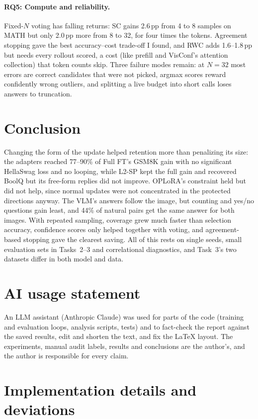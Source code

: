 \documentclass{article}
\newcommand{\pp}{\,pp}
\begin{document}
\paragraph{RQ5: Compute and reliability.} Fixed-$N$ voting has falling returns: SC gains 2.6\pp{} from 4 to 8 samples on MATH but only 2.0\pp{} more from 8 to 32, for four times the tokens. Agreement stopping gave the best accuracy--cost trade-off I found, and RWC adds 1.6--1.8\pp{} but needs every rollout scored, a cost (like prefill and VisConf's attention collection) that token counts skip. Three failure modes remain: at $N{=}32$ most errors are correct candidates that were not picked, argmax scores reward confidently wrong outliers, and splitting a live budget into short calls loses answers to truncation.

\section{Conclusion}
Changing the form of the update helped retention more than penalizing its size: the adapters reached 77--90\% of Full FT's GSM8K gain with no significant HellaSwag loss and no looping, while L2-SP kept the full gain and recovered BoolQ but its free-form replies did not improve. OPLoRA's constraint held but did not help, since normal updates were not concentrated in the protected directions anyway. The VLM's answers follow the image, but counting and yes/no questions gain least, and 44\% of natural pairs get the same answer for both images. With repeated sampling, coverage grew much faster than selection accuracy, confidence scores only helped together with voting, and agreement-based stopping gave the clearest saving. All of this rests on single seeds, small evaluation sets in Tasks~2--3 and correlational diagnostics, and Task~3's two datasets differ in both model and data.

\clearpage


\section*{AI usage statement}
An LLM assistant (Anthropic Claude) was used for parts of the code (training and evaluation loops, analysis scripts, tests) and to fact-check the report against the saved results, edit and shorten the text, and fix the LaTeX layout. The experiments, manual audit labels, results and conclusions are the author's, and the author is responsible for every claim.
\appendix
\section{Implementation details and deviations}\label{app:details}
\end{document}
